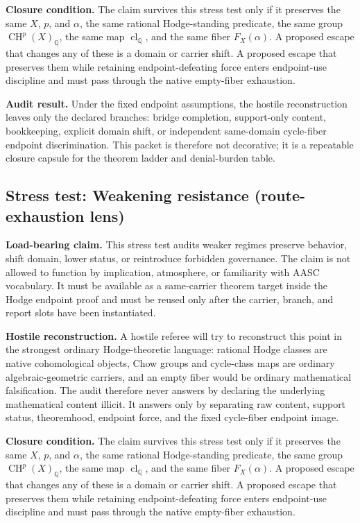 \documentclass[11pt]{article}
\newcommand{\QQ}{\mathbb{Q}}
\newcommand{\CH}{\operatorname{CH}}
\newcommand{\clQ}{\operatorname{cl}_{\QQ}}
\begin{document}
\par\noindent\textbf{Closure condition.} The claim survives this stress test only if it preserves the same $X$, $p$, and $\alpha$, the same rational Hodge-standing predicate, the same group $\CH^p(X)_\QQ$, the same map $\clQ$, and the same fiber $F_X(\alpha)$. A proposed escape that changes any of these is a domain or carrier shift. A proposed escape that preserves them while retaining endpoint-defeating force enters endpoint-use discipline and must pass through the native empty-fiber exhaustion.

\par\noindent\textbf{Audit result.} Under the fixed endpoint assumptions, the hostile reconstruction leaves only the declared branches: bridge completion, support-only content, bookkeeping, explicit domain shift, or independent same-domain cycle-fiber endpoint discrimination. This packet is therefore not decorative; it is a repeatable closure capsule for the theorem ladder and denial-burden table.


\subsection{Stress test: Weakening resistance (route-exhaustion lens)}

\par\noindent\textbf{Load-bearing claim.} This stress test audits weaker regimes preserve behavior, shift domain, lower status, or reintroduce forbidden governance. The claim is not allowed to function by implication, atmosphere, or familiarity with AASC vocabulary. It must be available as a same-carrier theorem target inside the Hodge endpoint proof and must be reused only after the carrier, branch, and report slots have been instantiated.

\par\noindent\textbf{Hostile reconstruction.} A hostile referee will try to reconstruct this point in the strongest ordinary Hodge-theoretic language: rational Hodge classes are native cohomological objects, Chow groups and cycle-class maps are ordinary algebraic-geometric carriers, and an empty fiber would be ordinary mathematical falsification. The audit therefore never answers by declaring the underlying mathematical content illicit. It answers only by separating raw content, support status, theoremhood, endpoint force, and the fixed cycle-fiber endpoint image.

\par\noindent\textbf{Closure condition.} The claim survives this stress test only if it preserves the same $X$, $p$, and $\alpha$, the same rational Hodge-standing predicate, the same group $\CH^p(X)_\QQ$, the same map $\clQ$, and the same fiber $F_X(\alpha)$. A proposed escape that changes any of these is a domain or carrier shift. A proposed escape that preserves them while retaining endpoint-defeating force enters endpoint-use discipline and must pass through the native empty-fiber exhaustion.
\end{document}
